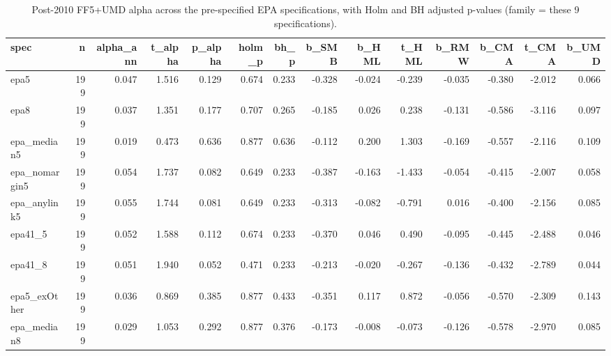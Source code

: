 \begin{table}
\caption{Post-2010 FF5+UMD alpha across the pre-specified EPA specifications, with Holm and BH adjusted p-values (family = these 9 specifications).}
\label{tab:m4_family}
\begin{tabular}{lrrrrrrrrrrrrr}
\toprule
spec & n & alpha\_ann & t\_alpha & p\_alpha & holm\_p & bh\_p & b\_SMB & b\_HML & t\_HML & b\_RMW & b\_CMA & t\_CMA & b\_UMD \\
\midrule
epa5 & 199 & 0.047 & 1.516 & 0.129 & 0.674 & 0.233 & -0.328 & -0.024 & -0.239 & -0.035 & -0.380 & -2.012 & 0.066 \\
epa8 & 199 & 0.037 & 1.351 & 0.177 & 0.707 & 0.265 & -0.185 & 0.026 & 0.238 & -0.131 & -0.586 & -3.116 & 0.097 \\
epa\_median5 & 199 & 0.019 & 0.473 & 0.636 & 0.877 & 0.636 & -0.112 & 0.200 & 1.303 & -0.169 & -0.557 & -2.116 & 0.109 \\
epa\_nomargin5 & 199 & 0.054 & 1.737 & 0.082 & 0.649 & 0.233 & -0.387 & -0.163 & -1.433 & -0.054 & -0.415 & -2.007 & 0.058 \\
epa\_anylink5 & 199 & 0.055 & 1.744 & 0.081 & 0.649 & 0.233 & -0.313 & -0.082 & -0.791 & 0.016 & -0.400 & -2.156 & 0.085 \\
epa41\_5 & 199 & 0.052 & 1.588 & 0.112 & 0.674 & 0.233 & -0.370 & 0.046 & 0.490 & -0.095 & -0.445 & -2.488 & 0.046 \\
epa41\_8 & 199 & 0.051 & 1.940 & 0.052 & 0.471 & 0.233 & -0.213 & -0.020 & -0.267 & -0.136 & -0.432 & -2.789 & 0.044 \\
epa5\_exOther & 199 & 0.036 & 0.869 & 0.385 & 0.877 & 0.433 & -0.351 & 0.117 & 0.872 & -0.056 & -0.570 & -2.309 & 0.143 \\
epa\_median8 & 199 & 0.029 & 1.053 & 0.292 & 0.877 & 0.376 & -0.173 & -0.008 & -0.073 & -0.126 & -0.578 & -2.970 & 0.085 \\
\bottomrule
\end{tabular}
\end{table}
